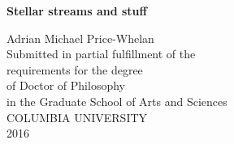 \clearpage
\thispagestyle{empty}
\begin{center}

$\left. \right.$

\vspace{0.7in}

{\Large \bf Stellar streams and stuff}

\vspace{0.75in}
{\large  Adrian Michael Price-Whelan} \\


\vspace{2.75in}
\setlength{\baselineskip}{0.625 \baselineskip}
{Submitted in partial fulfillment of the} \\
{requirements for the degree} \\
{of Doctor of Philosophy} \\
{in the Graduate School of Arts and Sciences} \\
\vspace{.4in}
\setlength{\baselineskip}{1.6 \baselineskip}
{COLUMBIA UNIVERSITY} \\
{2016} \\

\end{center}


\clearpage
